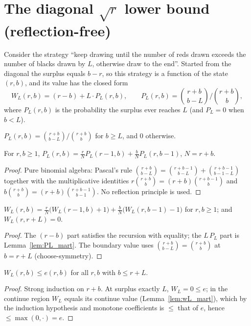 \section{The diagonal $\sqrt r$ lower bound (reflection-free)}

Consider the strategy ``keep drawing until the number of reds drawn exceeds the
number of blacks drawn by $L$, otherwise draw to the end''. Started from the
diagonal the surplus equals $b-r$, so this strategy is a function of the state
$(r,b)$, and its value has the closed form
\[
  W_L(r,b) = (r-b) + L\cdot P_L(r,b),\qquad
  P_L(r,b) = \binom{r+b}{\,b-L}\big/\binom{r+b}{\,b},
\]
where $P_L(r,b)$ is the probability the surplus ever reaches $L$ (and $P_L=0$ when
$b<L$).

\begin{definition}\label{def:PL}
\leanok
$P_L(r,b)=\binom{r+b}{b-L}/\binom{r+b}{b}$ for $b\ge L$, and $0$ otherwise.
\end{definition}

\begin{lemma}[$P_L$ is a martingale]\label{lem:PL_mart}
\leanok
{}
For $r,b\ge1$, $P_L(r,b)=\tfrac{r}{N}P_L(r-1,b)+\tfrac{b}{N}P_L(r,b-1)$, $N=r+b$.
\end{lemma}
\begin{proof}\leanok
Pure binomial algebra: Pascal's rule
$\binom{r+b}{b-L}=\binom{r+b-1}{b-L}+\binom{r+b-1}{b-1-L}$ together with the
multiplicative identities $r\binom{r+b}{b}=(r+b)\binom{r+b-1}{b}$ and
$b\binom{r+b}{b}=(r+b)\binom{r+b-1}{b-1}$. No reflection principle is used.
\end{proof}

\begin{lemma}\label{lem:wL_mart}
\leanok
{}
$W_L(r,b)=\tfrac{r}{N}\big(W_L(r-1,b)+1\big)+\tfrac{b}{N}\big(W_L(r,b-1)-1\big)$ for
$r,b\ge1$; and $W_L(r,r+L)=0$.
\end{lemma}
\begin{proof}\leanok
The $(r-b)$ part satisfies the recursion with equality; the $L\,P_L$ part is
Lemma~\ref{lem:PL_mart}. The boundary value uses $\binom{r+b}{b-L}=\binom{r+b}{b}$
at $b=r+L$ (choose-symmetry).
\end{proof}

\begin{proposition}[Domination]\label{prop:wL_le_e}
\leanok
{}
$W_L(r,b)\le e(r,b)$ for all $r,b$ with $b\le r+L$.
\end{proposition}
\begin{proof}\leanok
Strong induction on $r+b$. At surplus exactly $L$, $W_L=0\le e$; in the continue
region $W_L$ equals its continue value (Lemma~\ref{lem:wL_mart}), which by the
induction hypothesis and monotone coefficients is $\le$ that of $e$, hence
$\le\max(0,\cdot)=e$.
\end{proof}

